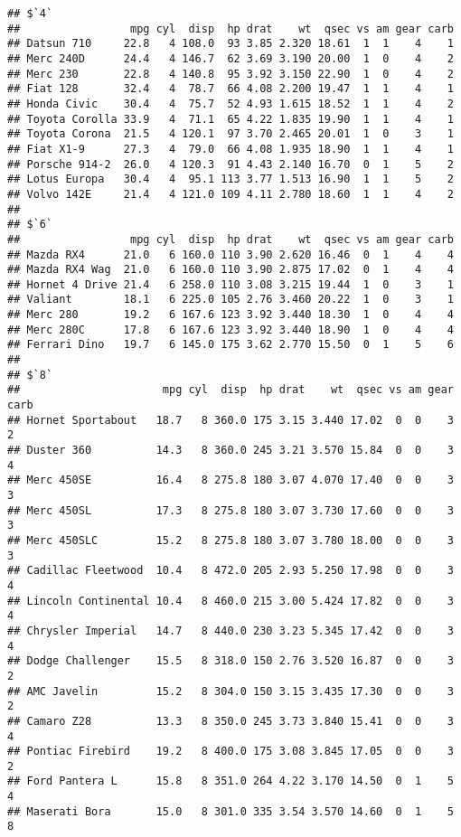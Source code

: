 \documentclass[
]{book}
\begin{document}
\begin{verbatim}
## $`4`
##                 mpg cyl  disp  hp drat    wt  qsec vs am gear carb
## Datsun 710     22.8   4 108.0  93 3.85 2.320 18.61  1  1    4    1
## Merc 240D      24.4   4 146.7  62 3.69 3.190 20.00  1  0    4    2
## Merc 230       22.8   4 140.8  95 3.92 3.150 22.90  1  0    4    2
## Fiat 128       32.4   4  78.7  66 4.08 2.200 19.47  1  1    4    1
## Honda Civic    30.4   4  75.7  52 4.93 1.615 18.52  1  1    4    2
## Toyota Corolla 33.9   4  71.1  65 4.22 1.835 19.90  1  1    4    1
## Toyota Corona  21.5   4 120.1  97 3.70 2.465 20.01  1  0    3    1
## Fiat X1-9      27.3   4  79.0  66 4.08 1.935 18.90  1  1    4    1
## Porsche 914-2  26.0   4 120.3  91 4.43 2.140 16.70  0  1    5    2
## Lotus Europa   30.4   4  95.1 113 3.77 1.513 16.90  1  1    5    2
## Volvo 142E     21.4   4 121.0 109 4.11 2.780 18.60  1  1    4    2
## 
## $`6`
##                 mpg cyl  disp  hp drat    wt  qsec vs am gear carb
## Mazda RX4      21.0   6 160.0 110 3.90 2.620 16.46  0  1    4    4
## Mazda RX4 Wag  21.0   6 160.0 110 3.90 2.875 17.02  0  1    4    4
## Hornet 4 Drive 21.4   6 258.0 110 3.08 3.215 19.44  1  0    3    1
## Valiant        18.1   6 225.0 105 2.76 3.460 20.22  1  0    3    1
## Merc 280       19.2   6 167.6 123 3.92 3.440 18.30  1  0    4    4
## Merc 280C      17.8   6 167.6 123 3.92 3.440 18.90  1  0    4    4
## Ferrari Dino   19.7   6 145.0 175 3.62 2.770 15.50  0  1    5    6
## 
## $`8`
##                      mpg cyl  disp  hp drat    wt  qsec vs am gear carb
## Hornet Sportabout   18.7   8 360.0 175 3.15 3.440 17.02  0  0    3    2
## Duster 360          14.3   8 360.0 245 3.21 3.570 15.84  0  0    3    4
## Merc 450SE          16.4   8 275.8 180 3.07 4.070 17.40  0  0    3    3
## Merc 450SL          17.3   8 275.8 180 3.07 3.730 17.60  0  0    3    3
## Merc 450SLC         15.2   8 275.8 180 3.07 3.780 18.00  0  0    3    3
## Cadillac Fleetwood  10.4   8 472.0 205 2.93 5.250 17.98  0  0    3    4
## Lincoln Continental 10.4   8 460.0 215 3.00 5.424 17.82  0  0    3    4
## Chrysler Imperial   14.7   8 440.0 230 3.23 5.345 17.42  0  0    3    4
## Dodge Challenger    15.5   8 318.0 150 2.76 3.520 16.87  0  0    3    2
## AMC Javelin         15.2   8 304.0 150 3.15 3.435 17.30  0  0    3    2
## Camaro Z28          13.3   8 350.0 245 3.73 3.840 15.41  0  0    3    4
## Pontiac Firebird    19.2   8 400.0 175 3.08 3.845 17.05  0  0    3    2
## Ford Pantera L      15.8   8 351.0 264 4.22 3.170 14.50  0  1    5    4
## Maserati Bora       15.0   8 301.0 335 3.54 3.570 14.60  0  1    5    8
\end{verbatim}
\end{document}
